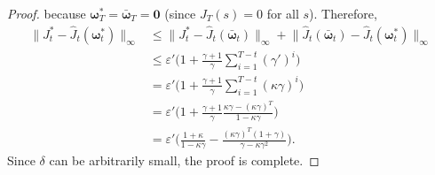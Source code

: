 \documentclass[11pt, notitlepage]{article}
\newcommand{\1}{\mathbbm{1}}
\begin{document}
\begin{proof}
    because $\boldsymbol{\omega}_{T}^* = \bar{\boldsymbol{\omega}}_T = \boldsymbol{0}$ (since $J_T(s) = 0$ for all $s$). Therefore,
    \begin{align*}
        \bigl \|J_t^* - \hat{J}_t(\boldsymbol{\omega}_t^*) \bigr\|_\infty
        &\leq \bigl \|J_t^* - \hat{J}_t(\bar{\boldsymbol{\omega}}_t) \bigr\|_\infty + \bigl \|\hat{J}_t(\bar{\boldsymbol{\omega}}_t) - \hat{J}_t(\boldsymbol{\omega}_t^*)\bigr\|_\infty\\
        &\leq \varepsilon' \biggl ( 1 + \frac{\gamma+1}{\gamma} \sum_{i=1}^{T-t}(\gamma')^i \biggr)\\
        &= \varepsilon' \biggl ( 1 + \frac{\gamma+1}{\gamma} \sum_{i=1}^{T-t}(\kappa \gamma)^i \biggr)\\
        &= \varepsilon' \biggl ( 1 + \frac{\gamma+1}{\gamma} \frac{\kappa \gamma - (\kappa \gamma)^T}{1-\kappa \gamma}\biggr)\\
        &= \varepsilon' \biggl ( \frac{1+\kappa}{1-\kappa\gamma} - \frac{(\kappa\gamma)^T(1+\gamma)}{\gamma-\kappa\gamma^2}\biggr).
    \end{align*}
    Since $\delta$ can be arbitrarily small, the proof is complete.
\end{proof}
    
    
    
    


    
\end{document}
